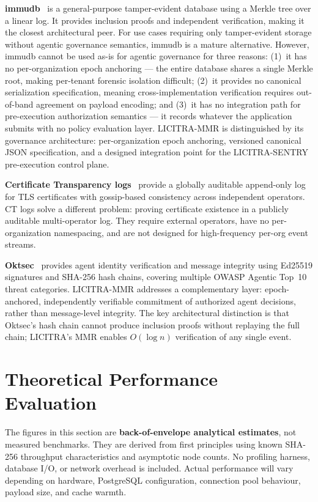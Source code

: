 \documentclass[sigconf,natbib=false]{acmart}
\begin{document}
\textbf{immudb}~\cite{immudb} is a general-purpose tamper-evident database
using a Merkle tree over a linear log. It provides inclusion proofs and
independent verification, making it the closest architectural peer. For use
cases requiring only tamper-evident storage without agentic governance
semantics, immudb is a mature alternative. However, immudb cannot be used
as-is for agentic governance for three reasons: (1)~it has no per-organization
epoch anchoring --- the entire database shares a single Merkle root, making
per-tenant forensic isolation difficult; (2)~it provides no canonical
serialization specification, meaning cross-implementation verification
requires out-of-band agreement on payload encoding; and (3)~it has no
integration path for pre-execution authorization semantics --- it records
whatever the application submits with no policy evaluation layer.
LICITRA-MMR is distinguished by its governance architecture: per-organization
epoch anchoring, versioned canonical JSON specification, and a designed
integration point for the LICITRA-SENTRY pre-execution control plane.

\textbf{Certificate Transparency logs}~\cite{laurie2013} provide a globally
auditable append-only log for TLS certificates with gossip-based consistency
across independent operators. CT logs solve a different problem: proving
certificate existence in a publicly auditable multi-operator log. They
require external operators, have no per-organization namespacing, and are
not designed for high-frequency per-org event streams.

\textbf{Oktsec}~\cite{oktsec} provides agent identity verification and
message integrity using Ed25519 signatures and SHA-256 hash chains, covering
multiple OWASP Agentic Top~10 threat categories. LICITRA-MMR addresses a
complementary layer: epoch-anchored, independently verifiable commitment of
authorized agent decisions, rather than message-level integrity. The key
architectural distinction is that Oktsec's hash chain cannot produce
inclusion proofs without replaying the full chain; LICITRA's MMR enables
$O(\log n)$ verification of any single event.

\section{Theoretical Performance Evaluation}

The figures in this section are \textbf{back-of-envelope analytical
estimates}, not measured benchmarks. They are derived from first principles
using known SHA-256 throughput characteristics and asymptotic node counts.
No profiling harness, database I/O, or network overhead is included.
Actual performance will vary depending on hardware, PostgreSQL
configuration, connection pool behaviour, payload size, and cache warmth.
\end{document}
